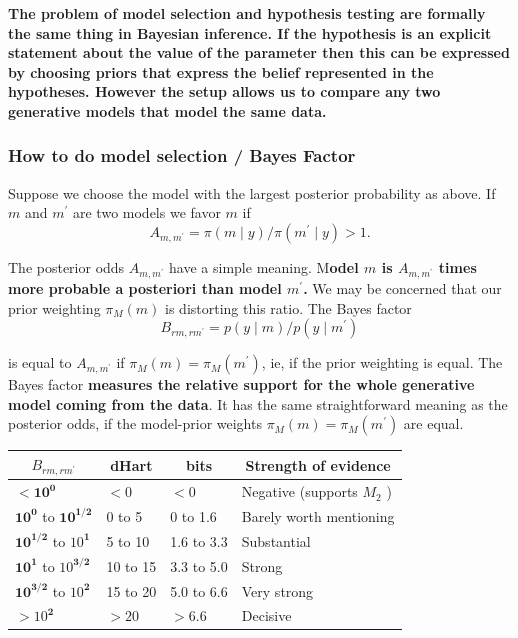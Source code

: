 \documentclass{article}
\begin{document}
\textbf{The problem of model selection and hypothesis testing are formally the same thing in Bayesian  inference. If the hypothesis is an explicit statement about the value of the parameter then this can  be expressed by choosing priors that express the belief represented in the hypotheses. However the  setup allows us to compare any two generative models that model the same data. }

\subsubsection{How to do model selection / Bayes Factor}

Suppose we choose the model with the largest posterior probability as above. If $m$ and $m^{\prime}$ are two models we favor $m$ if
$$
A_{m, m^{\prime}}=\pi(m \mid y) / \pi\left(m^{\prime} \mid y\right)>1 .
$$

The posterior odds $A_{m, m^{\prime}}$ have a simple meaning. M\textbf{odel $m$ is $A_{m, m^{\prime}}$ times more probable a posteriori than model $m^{\prime}$.} We may be concerned that our prior weighting $\pi_M(m)$ is distorting this ratio. The Bayes factor
$$
B_{r m, r m^{\prime}}=p(y \mid m) / p\left(y \mid m^{\prime}\right)
$$

is equal to $A_{m, m^{\prime}}$ if $\pi_M(m)=\pi_M\left(m^{\prime}\right)$, ie, if the prior weighting is equal. The Bayes factor\textbf{ measures the relative support for the whole generative model coming from the data}. It has the same straightforward meaning as the posterior odds, if the model-prior weights $\pi_M(m)=\pi_M\left(m^{\prime}\right)$ are equal.

\begin{tabular}{|l|l|l|l|}
\hline \multicolumn{1}{|c|}{$B_{r m, r m^{\prime}}$} & \multicolumn{1}{c|}{ dHart } & \multicolumn{1}{c|}{ bits } & \multicolumn{1}{c|}{ Strength of evidence } \\
\hline$<\mathbf{1 0}^{\mathbf{0}}$ & $<0$ & $<0$ & Negative (supports $M_2$ ) \\
\hline $\mathbf{1 0}^{\mathbf{0}}$ to $\mathbf{1 0}^{\mathbf{1 / 2}}$ & 0 to 5 & 0 to 1.6 & Barely worth mentioning \\
\hline $\mathbf{1 0}^{\mathbf{1 / 2}}$ to $10^{\mathbf{1}}$ & 5 to 10 & 1.6 to 3.3 & Substantial \\
\hline $\mathbf{1 0}^{\mathbf{1}}$ to $10^{\mathbf{3 / 2}}$ & 10 to 15 & 3.3 to 5.0 & Strong \\
\hline $\mathbf{1 0}^{\mathbf{3 / 2}}$ to $10^{\mathbf{2}}$ & 15 to 20 & 5.0 to 6.6 & Very strong \\
\hline$>10^{\mathbf{2}}$ & $>20$ & $>6.6$ & Decisive \\
\hline
\end{tabular}
\end{document}
